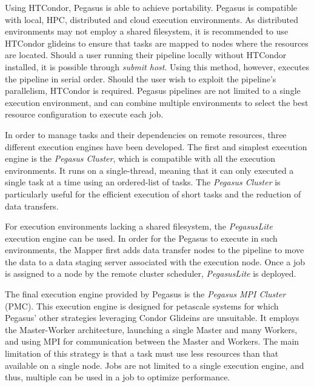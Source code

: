 \documentclass{report}
\begin{document}
        Using HTCondor, Pegasus is able to achieve portability. Pegasus is
        compatible with local, HPC, distributed and cloud execution
        environments. As distributed environments may not employ a shared
        filesystem, it is recommended to use HTCondor glideins to ensure that
        tasks are mapped to nodes where the resources are located. Should a user
        running their pipeline locally without HTCondor installed, it is
        possible through \textit{submit host}. Using this method, however,
        executes the pipeline in serial order. Should the user wish to exploit
        the pipeline's parallelism, HTCondor is required. Pegasus pipelines are
        not limited to a single execution environment, and can combine multiple
        environments to select the best resource configuration to execute each
        job.

        In order to manage tasks and their dependencies on remote resources,
        three different execution engines have been developed. The first and
        simplest execution engine is the \textit{Pegasus Cluster}, which is
        compatible with all the execution environments. It runs on a
        single-thread, meaning that it can only executed a single task at a time
        using an ordered-list of tasks.  The \textit{Pegasus Cluster} is
        particularly useful for the efficient execution of short tasks and the
        reduction of data transfers. 
        
        For execution environments lacking a shared filesystem, the
        \textit{PegasusLite} execution engine can be used. In order for the
        Pegasus to execute in such environments, the Mapper first adds data
        transfer nodes to the pipeline to move the data to a data staging server
        associated with the execution node. Once a job is assigned to a node by
        the remote cluster scheduler, \textit{PegasusLite} is deployed.

        The final execution engine provided by Pegasus is the \textit{Pegasus
        MPI Cluster} (PMC). This execution engine is designed for petascale
        systems for which Pegasus' other strategies leveraging Condor Glideins
        are unsuitable. It employs the Master-Worker architecture, launching a
        single Master and many Workers, and using MPI for communication between
        the Master and Workers. The main limitation of this strategy is that a
        task must use less resources than that available on a single node. Jobs
        are not limited to a single execution engine, and thus, multiple can be
        used in a job to optimize performance. 
 
\end{document}

